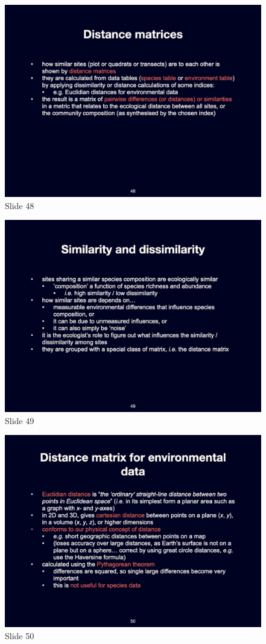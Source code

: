 \documentclass[
  11pt,
]{book}
\begin{document}
\begin{figure}[ht]
\centering
\includegraphics[width=0.8\linewidth]{../images/BDC334/BDC334-048.jpeg}
\caption*{Slide 48}
\end{figure}

\begin{figure}[ht]
\centering
\includegraphics[width=0.8\linewidth]{../images/BDC334/BDC334-049.jpeg}
\caption*{Slide 49}
\end{figure}

\begin{figure}[ht]
\centering
\includegraphics[width=0.8\linewidth]{../images/BDC334/BDC334-050.jpeg}
\caption*{Slide 50}
\end{figure}
\end{document}
